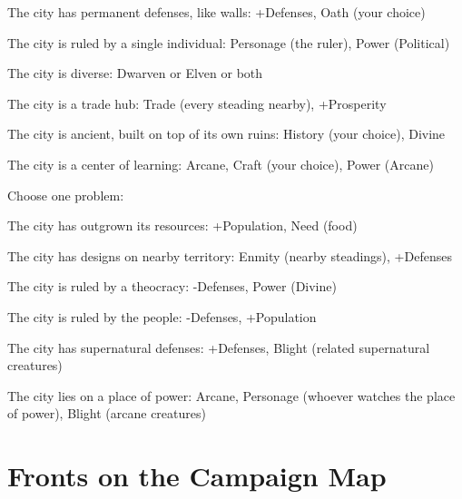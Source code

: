\item The city has permanent defenses, like walls: +Defenses, Oath (your choice)

         
\item The city is ruled by a single individual: Personage (the ruler), Power (Political)

         
\item The city is diverse: Dwarven or Elven or both

         
\item The city is a trade hub: Trade (every steading nearby), +Prosperity

         
\item The city is ancient, built on top of its own ruins: History (your choice), Divine

         
\item The city is a center of learning: Arcane, Craft (your choice), Power (Arcane)

       
\stopitemize
       

Choose one problem:

       
\startitemize[1,packed]
         
\item The city has outgrown its resources: +Population, Need (food)

         
\item The city has designs on nearby territory: Enmity (nearby steadings), +Defenses

         
\item The city is ruled by a theocracy: -Defenses, Power (Divine)

         
\item The city is ruled by the people: -Defenses, +Population

         
\item The city has supernatural defenses: +Defenses, Blight (related supernatural creatures)

         
\item The city lies on a place of power: Arcane, Personage (whoever watches the place of power), Blight (arcane creatures)

       
\stopitemize
       
\section{Fronts on the Campaign Map}     
       

